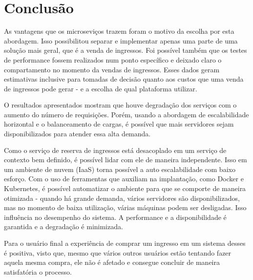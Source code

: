 \chapter*[Conclusão]{Conclusão}

As vantagens que os microseviços trazem foram o motivo da escolha por esta abordagem.
Isso possibilitou separar e implementar apenas uma parte
de uma solução mais geral, que é a venda de ingressos.
Foi possível também que os testes de performance fossem realizados num ponto específico
e deixado claro o compartamento no momento da vendas de ingressos.
Esses dados geram estimativas inclusive para tomadas de decisão quanto aos custos
que uma venda de ingressos pode gerar - e a escolha de qual plataforma utilizar.

O resultados apresentados mostram que houve degradação dos serviços com o aumento do
número de requisições.
Porém, usando a abordagem de escalabilidade horizontal e o balanceamento de cargas,
é possível que mais servidores sejam disponibilizados para atender essa alta demanda.

Como o serviço de reserva de ingressos está desacoplado em um serviço de contexto bem
definido, é possível lidar com ele de maneira independente.
Isso em um ambiente de nuvem (IaaS) torna possível a auto escalabilidade com baixo esforço.
Com o uso de ferramentas que auxiliam na implantação, como Docker e Kubernetes,
é possível automatizar o ambiente para que se comporte de maneira otimizada -
quando há grande demanda, vários servidores são disponibilizados, mas no momento
de baixa utilização, várias máquinas podem ser desligadas.
Isso influência no desempenho do sistema.
A performance e a disponibilidade é garantida e a degradação é minimizada.

Para o usuário final a experiência de comprar um ingresso em um sistema desses
é positiva, visto que, mesmo que vários outros usuários estão tentando
fazer aquela mesma compra, ele não é afetado e consegue concluir de maneira
satisfatória o processo.
